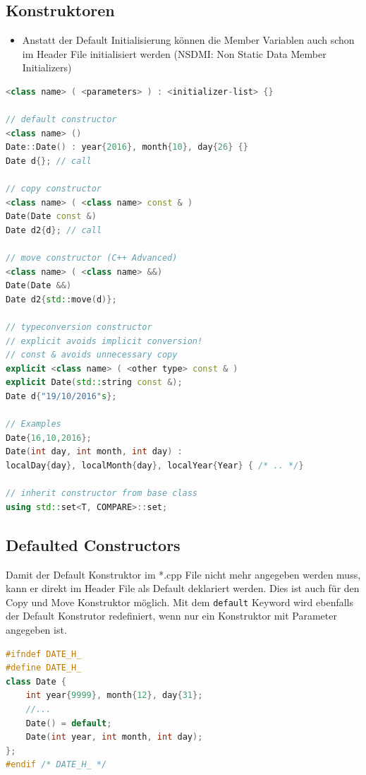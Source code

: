 \subsection{Konstruktoren}
\begin{itemize}
	\item Anstatt der Default Initialisierung können die Member Variablen auch schon im Header File initialisiert werden (NSDMI: Non Static Data Member Initializers)
\end{itemize}
\begin{lstlisting}[language=C++, caption=Konstruktoren]
<class name> ( <parameters> ) : <initializer-list> {}

// default constructor
<class name> ()
Date::Date() : year{2016}, month{10}, day{26} {}
Date d{}; // call

// copy constructor
<class name> ( <class name> const & ) 
Date(Date const &)
Date d2{d}; // call

// move constructor (C++ Advanced)
<class name> ( <class name> &&) 
Date(Date &&)
Date d2{std::move(d)};

// typeconversion constructor 
// explicit avoids implicit conversion!
// const & avoids unnecessary copy
explicit <class name> ( <other type> const & )
explicit Date(std::string const &);
Date d{"19/10/2016"s};

// Examples
Date{16,10,2016};
Date(int day, int month, int day) :
localDay{day}, localMonth{day}, localYear{Year} { /* .. */}

// inherit constructor from base class
using std::set<T, COMPARE>::set;
\end{lstlisting}

\subsection{Defaulted Constructors}
Damit der Default Konstruktor im *.cpp File nicht mehr angegeben werden muss, kann er direkt im Header File als Default deklariert werden. Dies ist auch für den Copy und Move Konstruktor möglich. Mit dem \lstinline|default| Keyword wird ebenfalls der Default Konstrutor redefiniert, wenn nur ein Konstruktor mit Parameter angegeben ist.
\begin{lstlisting}[language=C++, caption=Defaulted Constructors]
#ifndef DATE_H_
#define DATE_H_
class Date {
	int year{9999}, month{12}, day{31};
	//...
	Date() = default;
	Date(int year, int month, int day);
};
#endif /* DATE_H_ */
\end{lstlisting}

